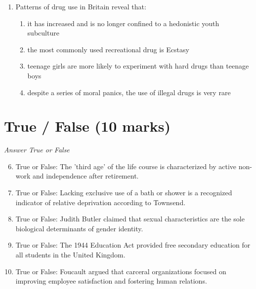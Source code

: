 \documentclass[12pt]{article}
\begin{document}
\begin{enumerate}[label=\arabic*.]
\begin{enumerate}[label=(\alph*)]
    \item finding out which topics are important to the respondents
    \item testing out your computer and printer
    \item identifying any problems with the question wording and routing
    \item deciding which respondents to leave out of the final sample
\end{enumerate}
\item Patterns of drug use in Britain reveal that:
\begin{enumerate}[label=(\alph*)]
    \item it has increased and is no longer confined to a hedonistic youth subculture
    \item the most commonly used recreational drug is Ecstasy
    \item teenage girls are more likely to experiment with hard drugs than teenage boys
    \item despite a series of moral panics, the use of illegal drugs is very rare
\end{enumerate}
\end{enumerate}

\section*{True / False (10 marks)}
\textit{Answer True or False}
\begin{enumerate}[label=\arabic*.]
\setcounter{enumi}{5}
\item True or False: The 'third age' of the life course is characterized by active non-work and independence after retirement.
\item True or False: Lacking exclusive use of a bath or shower is a recognized indicator of relative deprivation according to Townsend.
\item True or False: Judith Butler claimed that sexual characteristics are the sole biological determinants of gender identity.
\item True or False: The 1944 Education Act provided free secondary education for all students in the United Kingdom.
\item True or False: Foucault argued that carceral organizations focused on improving employee satisfaction and fostering human relations.
\end{enumerate}
\end{document}
